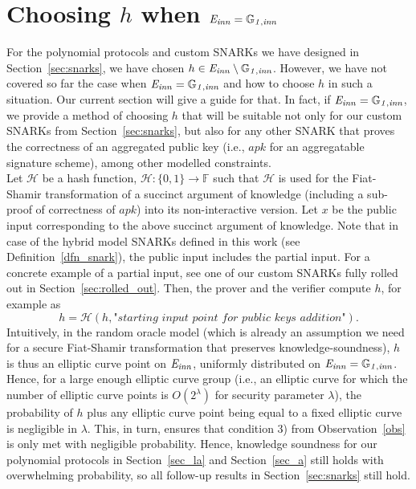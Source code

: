 \section{Choosing $h$ when $\mathit{E}_{\mathit{inn}} = \mathbb{G}_{\mathit{1,inn}}$}
\label{sec:other_choice_h}

\noindent For the polynomial protocols and custom SNARKs we have designed in Section~\ref{sec:snarks}, we have chosen 
$h \in \mathit{E}_{\mathit{inn}} \setminus \mathbb{G}_{\mathit{1,inn}}$. However, we have not covered so far the case when $\mathit{E}_{\mathit{inn}} = \mathbb{G}_{\mathit{1,inn}}$ and how to 
choose $h$ in such a situation. Our current section will give a guide for that. In fact, if $\mathit{E}_{\mathit{inn}} = \mathbb{G}_{\mathit{1,inn}}$, we provide a 
method of choosing $h$ that will be suitable not only for our custom SNARKs from Section~\ref{sec:snarks}, but also for any other SNARK that proves the 
correctness of an aggregated public key (i.e., $\mathit{apk}$ for an aggregatable signature scheme), among other modelled constraints. \\

\noindent Let $\mathcal{H}$ be a hash function, $\mathcal{H}: \{0, 1\} \rightarrow \mathbb{F}$ such that $\mathcal{H}$ is used for 
the Fiat-Shamir transformation of a succinct argument of knowledge (including a sub-proof of correctness of $\mathit{apk}$) 
into its non-interactive version. Let $x$ be the public input corresponding to the above succinct argument of knowledge. 
Note that in case of the hybrid model SNARKs defined in this work (see Definition~\ref{dfn_snark}), the public input includes the partial input. 
For a concrete example of a partial input, see one of our custom SNARKs fully rolled out in Section~\ref{sec:rolled_out}. Then, the prover and 
the verifier compute $h$, for example as $$h = \mathcal{H}(h, \textit{"starting \ input \ point \ for \ public \ keys \ addition"}).$$ Intuitively, in the 
random oracle model (which is already an assumption we need for a secure Fiat-Shamir transformation that preserves knowledge-soundness), 
$h$ is thus an elliptic curve point on $\mathit{E}_{\mathit{inn}}$, uniformly distributed on $\mathit{E}_{\mathit{inn}} = \mathbb{G}_{\mathit{1,inn}}$. Hence, for a large enough elliptic curve group (i.e., an 
elliptic curve for which the number of elliptic curve points is $O(2^{\lambda})$ for security parameter $\lambda$), the probability of $h$ plus 
any elliptic curve point being equal to a fixed elliptic curve is negligible in $\lambda$. This, in turn, ensures that condition 
3) from Observation~\ref{obs} is only met with negligible probability. Hence, knowledge soundness 
for our polynomial protocols in Section~\ref{sec_la} and Section~\ref{sec_a} still holds with overwhelming probability, so all follow-up results in 
Section~\ref{sec:snarks} still hold.
